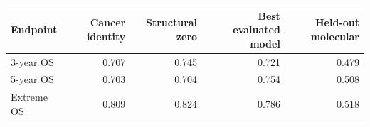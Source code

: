 \begin{tabular}{lrrrr}
\toprule
Endpoint & Cancer identity & Structural zero & Best evaluated model & Held-out molecular \\
\midrule
3-year OS & 0.707 & 0.745 & 0.721 & 0.479 \\
5-year OS & 0.703 & 0.704 & 0.754 & 0.508 \\
Extreme OS & 0.809 & 0.824 & 0.786 & 0.518 \\
\bottomrule
\end{tabular}
